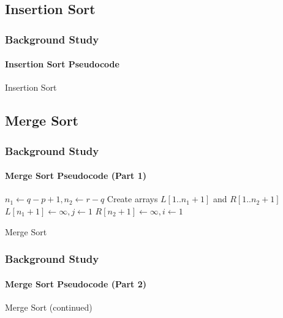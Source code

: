 \documentclass{beamer}
\begin{document}
\subsection{Insertion Sort}
\begin{frame}[t]
    \frametitle{Background Study}
    \framesubtitle{Insertion Sort Pseudocode}
    \begin{algorithm}[H]
        \SetAlgoLined
        \caption{Insertion Sort}
    \end{algorithm}
\end{frame}

\subsection{Merge Sort}

\begin{frame}[t]
    \frametitle{Background Study}
    \framesubtitle{Merge Sort Pseudocode (Part 1)}

    \begin{algorithm}[H]
        \SetAlgoLined

        $n_1 \gets q - p + 1, n_2 \gets r - q$\;
        Create arrays $L[1..n_1+1]$ and $R[1..n_2+1]$\;
        $L[n_1+1] \gets \infty, j \gets 1$\;
        $R[n_2+1] \gets \infty,i \gets 1$\;
        \caption{Merge Sort}
    \end{algorithm}
\end{frame}

\begin{frame}[t]
    \frametitle{Background Study}
    \framesubtitle{Merge Sort Pseudocode (Part 2)}

    \begin{algorithm}[H]
        \caption*{Merge Sort (continued)}
    \end{algorithm}
\end{frame}
\end{document}
